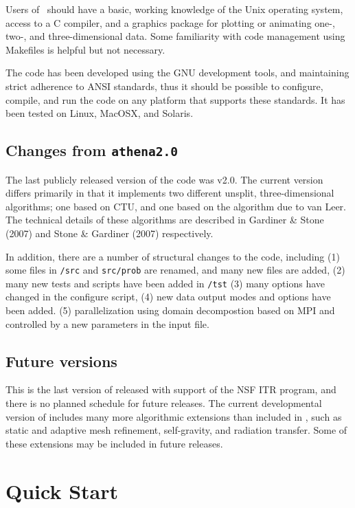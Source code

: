 Users of \ath\ should have a basic, working knowledge of the Unix
operating system, access to a C compiler, and a graphics package for
plotting or animating one-, two-, and three-dimensional data.  Some familiarity
with code management using Makefiles is helpful but not necessary.

The code has been developed using the GNU development tools, and
maintaining strict adherence to ANSI standards, thus it should be possible
to configure, compile, and run the code on any platform that supports these
standards.  It has been tested on Linux, MacOSX, and Solaris.

\subsection{Changes from {\tt athena2.0}}

The last publicly released version of the code was v2.0.  The current version
differs primarily in that it implements two different unsplit, three-dimensional
algorithms; one based on CTU, and one based on the algorithm due to 
van Leer.  
The technical details of these algorithms
are described in Gardiner \& Stone (2007) and Stone \& Gardiner (2007)
respectively. 

In addition, there are a number of structural changes to the code, including
(1) some files in {\tt /src} and {\tt src/prob} are renamed, and many new files are added,
(2) many new tests and scripts have been added in {\tt /tst}
(3) many options have changed in the configure script,
(4) new data output modes and options have been added.
(5) parallelization using domain decompostion based on MPI and controlled
by a new parameters in the input file.

\subsection{Future versions}

This is the last version of \ath released with support of the NSF
ITR program, and there is no planned schedule for future releases.
The current developmental version of \ath includes many more
algorithmic extensions than included in \ath, such as static and
adaptive mesh refinement, self-gravity, and radiation transfer.
Some of these extensions may be included in future releases.

\section{Quick Start}

